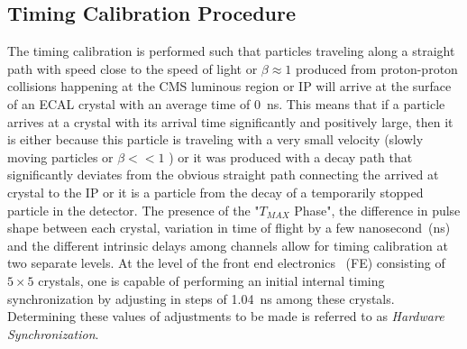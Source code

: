 \subsection{Timing Calibration Procedure}
The timing calibration is performed such that particles traveling along a straight path with speed close to the speed of light or $\beta \approx 1$ produced from proton-proton collisions happening at the CMS luminous region or IP will arrive at the surface of an ECAL crystal  with an average time of 0~ns. This means that if a particle arrives at a crystal with its arrival time significantly and positively large, then it is either because this particle is traveling with a very small velocity (slowly moving particles or  $\beta << 1$ ) or it was produced with a decay path that  significantly deviates from the obvious straight path connecting the arrived at crystal to the IP or it is a particle from the decay of a temporarily stopped particle in the detector.
The presence of the "$T_{MAX}$ Phase", the difference in pulse shape between each crystal, variation in time of flight by a few nanosecond~(ns) and the different intrinsic delays among channels allow for timing calibration at two separate levels.
At the level of the front end electronics ~(FE) consisting of $5\times5$ crystals, one is capable of performing an initial internal timing synchronization by adjusting in steps of 1.04~ns among these crystals. Determining these values of adjustments to be made is referred to as \textit{Hardware Synchronization}.

